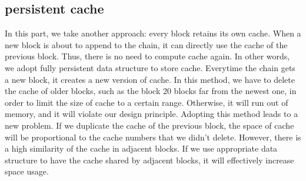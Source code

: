\documentclass[conference]{IEEEtran}
\begin{document}
\subsection{persistent cache}
In this part, we take another approach: every block retains its own cache. When a new block is about to append to the chain, it can directly use the cache of the previous block. Thus, there is no need to compute cache again. In other words, we adopt fully persistent data structure to store cache. Everytime the chain gets a new block, it creates a new version of cache.
In this method, we have to delete the cache of older blocks, such as the block 20 blocks far from the newest one, in order to limit the size of cache to a certain range. Otherwise, it will run out of memory, and it will violate our design principle.
Adopting this method leads to a new problem. If we duplicate the cache of the previous block, the space of cache will be proportional to the cache numbers that we didn’t delete. However, there is a high similarity of the cache in adjacent blocks. If we use appropriate data structure to have the cache shared by adjacent blocks, it will effectively increase space usage.
\end{document}
